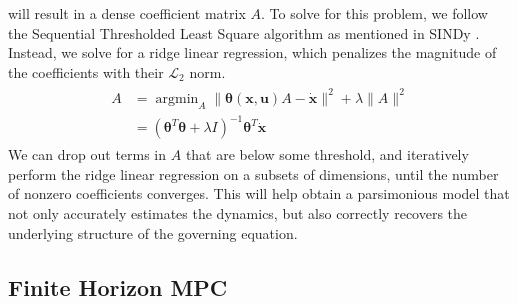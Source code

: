 \documentclass[10pt,twocolumn]{article}
\DeclareMathOperator*{\argmin}{argmin}
\begin{document}
will result in a dense coefficient matrix $A$. To solve for this problem, we follow
the Sequential Thresholded Least Square algorithm as mentioned in SINDy \cite{sindy}.
Instead, we solve for a ridge linear regression, which penalizes the magnitude of the coefficients
with their $\mathcal{L}_2$ norm.
\begin{gather}
  \begin{aligned}
    A &= \argmin_A \| \bm{\theta}(\bm{x}, \bm{u})A - \dot{\bm{x}} \|^2 + \lambda \| A \|^2 \\
      &= (\bm{\theta}^T \bm{\theta} + \lambda I)^{-1}\bm{\theta}^T \dot{\bm{x}}
  \end{aligned}
\end{gather}
We can drop out terms in $A$ that are below some threshold, and iteratively perform the
ridge linear regression on a subsets of dimensions, until the number of nonzero coefficients
converges. This will help obtain a parsimonious model that not only accurately estimates the
dynamics, but also correctly recovers the underlying structure of the governing equation.

\subsection{Finite Horizon MPC}
\end{document}
